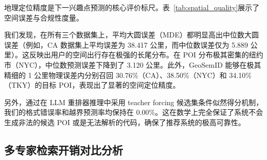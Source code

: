\documentclass[10pt,fontset=none,twocolumn]{ctexart}
\begin{document}
\begin{table}[!h]
\centering
\caption{地理预测物理大圆误差与合规性评估}
\label{tab:spatial_quality}
\end{table}

地理定位精度是下一兴趣点预测的核心评价标尺。表~\ref{tab:spatial_quality}展示了空间误差与合规性度量。

我们发现，在所有三个数据集上，平均大圆误差（MDE）都明显高出中位数大圆误差（例如，CA 数据集上平均误差为 38.417 公里，而中位数误差仅为 5.889 公里）。这反映出用户的空间出行存在极强的长尾分布。在 POI 分布极其密集的纽约市（NYC），中位数预测误差下降到了 3.120 公里。此外，GeoSemID 能够在极其精细的 1 公里物理误差内分别召回 30.76\%（CA）、38.50\%（NYC）和 34.10\%（TKY）的目标 POI，表现出了显著的空间定位精度。

另外，通过在 LLM 重排器推理中采用 teacher forcing 候选集条件似然得分机制，我们的格式错误率和越界预测率均保持在 0.00\%。这在数学上完全保证了系统不会生成非法的候选 POI 或是无法解析的代码，确保了推荐系统的极高可靠性。

\subsection{多专家检索开销对比分析}
\end{document}
